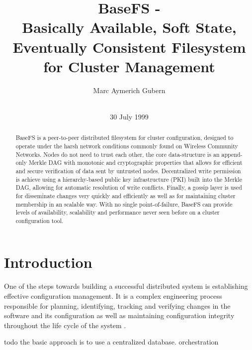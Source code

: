\documentclass{sig-alternate}
\begin{document}
\title{BaseFS -\\ Basically Available, Soft State, Eventually Consistent Filesystem for Cluster Management}
\author{
\alignauthor
Marc Aymerich Gubern\\
    \\
}
\additionalauthors{}
\date{30 July 1999}

\maketitle

\begin{abstract}
BaseFS is a peer-to-peer distributed filesystem for cluster configuration, designed to operate under the harsh network conditions commonly found on Wireless Community Networks. Nodes do not need to trust each other, the core data-structure is an append-only 
Merkle DAG with monotonic and cryptographic properties that allows for efficient and secure verification of data sent by untrusted nodes. Decentralized write permission is achieve using a hierarchy-based public key infrastructure (PKI) built into the Merkle DAG, allowing for automatic resolution of write conflicts. Finally, a gossip layer is used for disseminate changes very quickly and efficiently as well as for maintaining cluster membership in an scalable way. With no single point-of-failure, BaseFS can provide levels of availability, scalability and performance never seen before on a cluster configuration tool.

\end{abstract}
\section{Introduction}

One of the steps towards building a successful distributed system is establishing effective configuration management. It is a complex engineering process responsible for planning, identifying, tracking and verifying changes in the software and its configuration as well as maintaining configuration integrity throughout the life cycle of the system \cite{Yermolaiev:managing}.

todo the basic approach is to use a centralized database. orchestration
\end{document}
